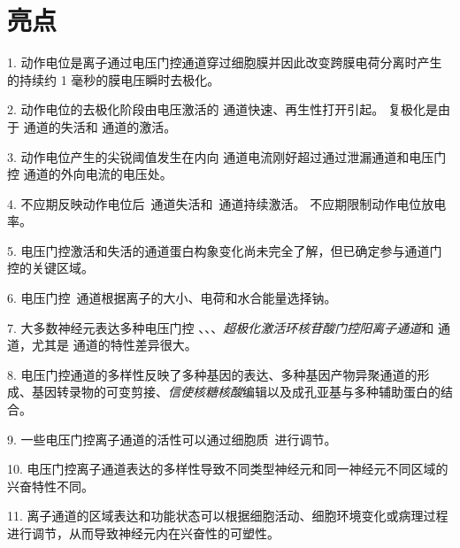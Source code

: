 \section{亮点}

1. 动作电位是离子通过电压门控通道穿过细胞膜并因此改变跨膜电荷分离时产生的持续约 1 毫秒的膜电压瞬时去极化。


2. 动作电位的去极化阶段由电压激活的  通道快速、再生性打开引起。
复极化是由于  通道的失活和  通道的激活。


3. 动作电位产生的尖锐阈值发生在内向  通道电流刚好超过通过泄漏通道和电压门控  通道的外向电流的电压处。


4. 不应期反映动作电位后~通道失活和~通道持续激活。
不应期限制动作电位放电率。


5. 电压门控激活和失活的通道蛋白构象变化尚未完全了解，但已确定参与通道门控的关键区域。


6. 电压门控~通道根据离子的大小、电荷和水合能量选择钠。


7. 大多数神经元表达多种电压门控 、、、\textit{超极化激活环核苷酸门控阳离子通道}和  通道，尤其是  通道的特性差异很大。


8. 电压门控通道的多样性反映了多种基因的表达、多种基因产物异聚通道的形成、基因转录物的可变剪接、\textit{信使核糖核酸}编辑以及成孔亚基与多种辅助蛋白的结合。


9. 一些电压门控离子通道的活性可以通过细胞质~进行调节。


10. 电压门控离子通道表达的多样性导致不同类型神经元和同一神经元不同区域的兴奋特性不同。


11. 离子通道的区域表达和功能状态可以根据细胞活动、细胞环境变化或病理过程进行调节，从而导致神经元内在兴奋性的可塑性。


